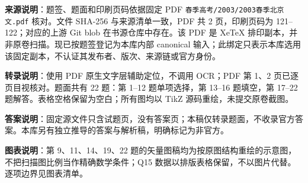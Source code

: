 

\begin{gktip}
\textbf{来源说明}：题签、题面和印刷页码依据固定 PDF \texttt{春季高考/2003/2003春季北京文.pdf} 核对。文件 SHA-256 与来源清单一致，PDF 共 2 页，印刷页码为 121–122；对应的上游 Git blob 在书源仓库中存在。该 PDF 是 XeTeX 排印副本，并非原卷扫描。现已按题签登记为本库内部 canonical 输入；此绑定只表示本库选用该固定副本，不认证其发布者、版次、来源链或官方身份。

\textbf{转录说明}：使用 PDF 原生文字层辅助定位，不调用 OCR；PDF 第 1、2 页已逐页目视核对。题面共有 22 题：第 1–12 题单项选择，第 13–16 题填空，第 17–22 题解答。表格空格保留为空白；所有图均以 TikZ 源码重绘，未提交原卷截图。

\textbf{答案说明}：固定源文件只含试题页，没有答案页；本稿仅转录题面，不收录官方答案。本库另有独立推导的答案与解析稿，明确标记为非官方。

\textbf{图表说明}：第 9、11、14、19、22 题的矢量图稿均为按原图结构重绘的示意图，不把扫描图比例当作精确数学条件；Q15 数据以排版表格保留，不以图片代替。逐项边界见图表清单。
\end{gktip}


